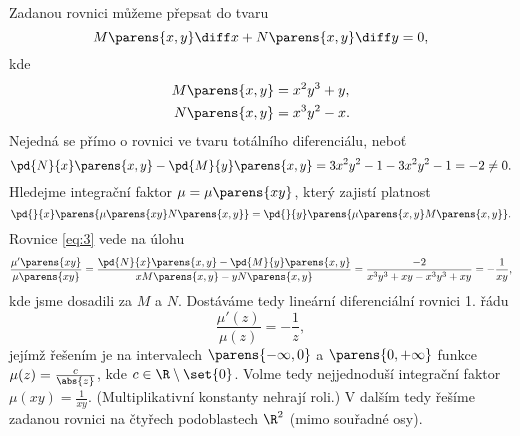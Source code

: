 \documentclass[answers]{exam}
\begin{document}
\begin{questions}
	\begin{solution}
		Zadanou rovnici můžeme přepsat do tvaru
		\begin{equation*}
			M\parens{x, y} \diff x + N\parens{x, y} \diff y = 0,
		\end{equation*}
		kde
		\begin{align*}
			M\parens{x, y} &= x^2 y^3 + y,
			\\
			N\parens{x, y} &= x^3 y^2 - x.
		\end{align*}
		Nejedná se přímo o rovnici ve tvaru totálního diferenciálu, neboť
		\begin{equation*}
			\pd{N}{x}\parens{x, y} - \pd{M}{y}\parens{x, y}
			=
			3 x^2 y^2  - 1 - 3 x^2 y^2 - 1
			=
			-2
			\neq 
			0.
		\end{equation*}
		Hledejme integrační faktor $\mu = \mu\parens{xy}$, který zajistí platnost
		\begin{equation}
			\label{eq:3}
			\pd{}{x}\parens{\mu\parens{xy}N\parens{x,y}} = \pd{}{y}\parens{\mu\parens{x, y}M\parens{x,y}}.
		\end{equation}
		Rovnice \eqref{eq:3} vede na úlohu
		\begin{equation*}
			\frac{\mu'\parens{xy}}{\mu\parens{xy}}
			=
			\frac{\pd{N}{x}\parens{x,y} - \pd{M}{y}\parens{x,y}}{xM\parens{x,y} - yN\parens{x,y}}
			=
			\frac{-2}{x^3y^3 + xy - x^3y^3 + xy}
			=
			-\frac{1}{xy},
		\end{equation*}
		kde jsme dosadili za $M$ a $N$. Dostáváme tedy lineární diferenciální rovnici 1. řádu
		\begin{equation*}
			\frac{\mu'(z)}{\mu(z)} = -\frac{1}{z},
		\end{equation*}
		jejímž řešením je na intervalech $\parens{-\infty, 0}$ a $\parens{0, +\infty}$ funkce $\mu(z) = \frac{c}{\abs{z}}$, kde $c \in \R \setminus \set{0}$. Volme tedy nejjednoduší integrační faktor $\mu(xy) = \frac{1}{xy}$. (Multiplikativní konstanty nehrají roli.) V dalším tedy řešíme zadanou rovnici na čtyřech podoblastech $\R^2$ (mimo souřadné osy).
		

\end{solution}
\end{questions}
\end{document}
